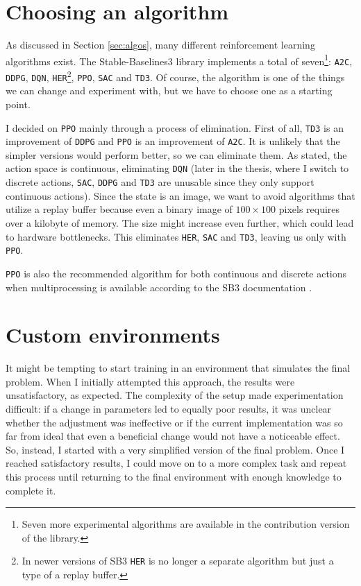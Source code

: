 \documentclass[
  digital,     %
  oneside,     %
  nosansbold,  %
  nocolorbold, %
  lof,         %
  lot,         %
]{fithesis4}
\begin{document}
\section{Choosing an algorithm}
As discussed in Section \ref{sec:algos}, many different reinforcement learning algorithms exist. The Stable-Baselines3 library implements a total of seven\footnote{Seven more experimental algorithms are available in the contribution version of the library.}: \texttt{A2C}, \texttt{DDPG}, \texttt{DQN}, \texttt{HER}\footnote{In newer versions of SB3 \texttt{HER} is no longer a separate algorithm but just a type of a replay buffer.}, \texttt{PPO}, \texttt{SAC} and \texttt{TD3}. Of course, the algorithm is one of the things we can change and experiment with, but we have to choose one as a starting point.

I decided on \texttt{PPO} mainly through a process of elimination. First of all, \texttt{TD3} is an improvement of \texttt{DDPG} and \texttt{PPO} is an improvement of \texttt{A2C}. It is unlikely that the simpler versions would perform better, so we can eliminate them. As stated, the action space is continuous, eliminating \texttt{DQN} (later in the thesis, where I switch to discrete actions, \texttt{SAC}, \texttt{DDPG} and \texttt{TD3} are unusable since they only support continuous actions). Since the state is an image, we want to avoid algorithms that utilize a replay buffer because even a binary image of $100\times100$ pixels requires over a kilobyte of memory. The size might increase even further, which could lead to hardware bottlenecks. This eliminates \texttt{HER}, \texttt{SAC} and \texttt{TD3}, leaving us only with \texttt{PPO}.

\texttt{PPO} is also the recommended algorithm for both continuous and discrete actions when multiprocessing is available according to the SB3 documentation \cite{SB3-docs}.

\section{Custom environments}
It might be tempting to start training in an environment that simulates the final problem. When I initially attempted this approach, the results were unsatisfactory, as expected. The complexity of the setup made experimentation difficult: if a change in parameters led to equally poor results, it was unclear whether the adjustment was ineffective or if the current implementation was so far from ideal that even a beneficial change would not have a noticeable effect. So, instead, I started with a very simplified version of the final problem. Once I reached satisfactory results, I could move on to a more complex task and repeat this process until returning to the final environment with enough knowledge to complete it.
\end{document}
